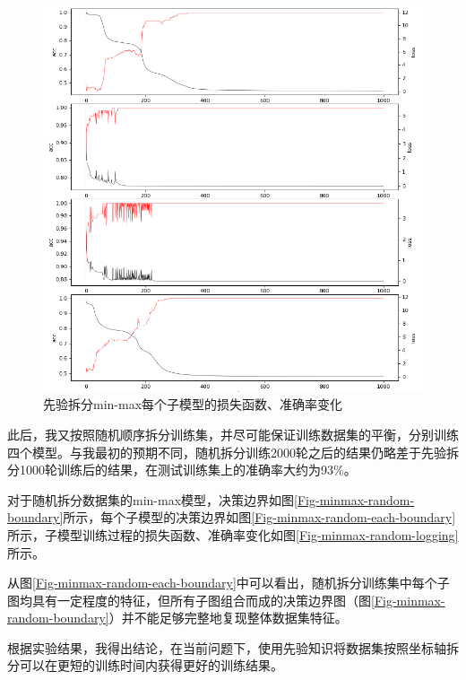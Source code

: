 \documentclass[12pt, a4paper, oneside]{ctexart}
\begin{document}
    \begin{figure}[htbp]
        \centering
        \includegraphics[width=1\textwidth]{figures/minmax_axis_logging.png}
        \caption{先验拆分min-max每个子模型的损失函数、准确率变化}
        \label{Fig-minmax-axis-logging}
    \end{figure}

    此后，我又按照随机顺序拆分训练集，并尽可能保证训练数据集的平衡，分别训练四个模型。与我最初的预期不同，随机拆分训练2000轮之后的结果仍略差于先验拆分1000轮训练后的结果，在测试训练集上的准确率大约为93\%。

    对于随机拆分数据集的min-max模型，决策边界如图\ref{Fig-minmax-random-boundary}所示，每个子模型的决策边界如图\ref{Fig-minmax-random-each-boundary}所示，子模型训练过程的损失函数、准确率变化如图\ref{Fig-minmax-random-logging}所示。

    从图\ref{Fig-minmax-random-each-boundary}中可以看出，随机拆分训练集中每个子图均具有一定程度的特征，但所有子图组合而成的决策边界图（图\ref{Fig-minmax-random-boundary}）并不能足够完整地复现整体数据集特征。

    根据实验结果，我得出结论，在当前问题下，使用先验知识将数据集按照坐标轴拆分可以在更短的训练时间内获得更好的训练结果。
\end{document}
